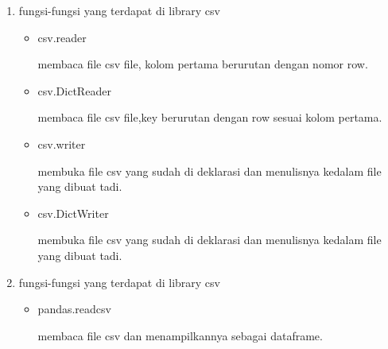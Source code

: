 \begin{enumerate}
\item fungsi-fungsi yang terdapat di library csv
\begin{itemize}
	\item csv.reader
	
	membaca file csv file, kolom pertama berurutan dengan nomor row. 
	
	\item csv.DictReader
	
	
	membaca file csv file,key berurutan dengan row sesuai kolom pertama.
		
	\item csv.writer
	
	membuka file csv yang sudah di deklarasi dan menulisnya kedalam file yang dibuat tadi.
		
	\item csv.DictWriter
	
	membuka file csv yang sudah di deklarasi dan menulisnya kedalam file yang dibuat tadi.	
	
\end{itemize}

\item fungsi-fungsi yang terdapat di library csv
\begin{itemize}

	\item pandas.read\textunderscore csv

	membaca file csv dan menampilkannya sebagai dataframe.
	
\end{itemize}

\end{enumerate}


